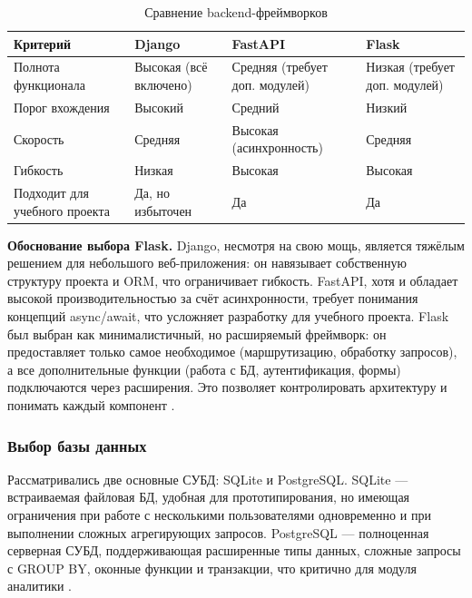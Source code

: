 \begin{table}[ht!]
    \centering
    \caption{Сравнение backend-фреймворков}
    \label{tab:backend}
    \begin{tabular}{|p{}|p{}|p{}|p{}|}
        \hline
        \textbf{Критерий}             & \textbf{Django}        & \textbf{FastAPI}               & \textbf{Flask}                \\ \hline
        Полнота функционала           & Высокая (всё включено) & Средняя (требует доп. модулей) & Низкая (требует доп. модулей) \\ \hline
        Порог вхождения               & Высокий                & Средний                        & Низкий                        \\ \hline
        Скорость                      & Средняя                & Высокая (асинхронность)        & Средняя                       \\ \hline
        Гибкость                      & Низкая                 & Высокая                        & Высокая                       \\ \hline
        Подходит для учебного проекта & Да, но избыточен       & Да                             & Да                            \\ \hline
    \end{tabular}
\end{table}

\textbf{Обоснование выбора Flask.} Django, несмотря на свою мощь, является тяжёлым решением 
для небольшого веб-приложения: он навязывает собственную структуру проекта и ORM, что 
ограничивает гибкость. FastAPI, хотя и обладает высокой производительностью за счёт 
асинхронности, требует понимания концепций async/await, что усложняет разработку для 
учебного проекта. Flask был выбран как минималистичный, но расширяемый фреймворк: он 
предоставляет только самое необходимое (маршрутизацию, обработку запросов), а все 
дополнительные функции (работа с БД, аутентификация, формы) подключаются через расширения. 
Это позволяет контролировать архитектуру и понимать каждый компонент \cite{flask_docs}. 

\subsubsection{Выбор базы данных}

Рассматривались две основные СУБД: SQLite и PostgreSQL. SQLite — встраиваемая файловая БД,
 удобная для прототипирования, но имеющая ограничения при работе с несколькими пользователями 
 одновременно и при выполнении сложных агрегирующих запросов. PostgreSQL — полноценная 
 серверная СУБД, поддерживающая расширенные типы данных, сложные запросы с GROUP BY, оконные 
 функции и транзакции, что критично для модуля аналитики \cite{postgresql_docs}. 

